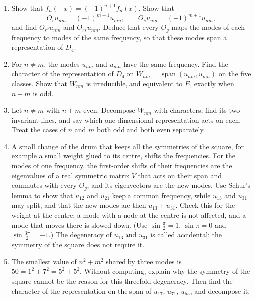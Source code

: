 \documentclass[11pt,a4paper]{article}
\makeatletter
\DeclareMathOperator{\spn}{span}
\newcommand{\showsolution}[1]{%
  \ifdefined\withsolutions\@ifundefined{sol@#1}{}{%
    \par\vspace{0.6em}\noindent\textbf{Solution.}\par\vspace{0.1em}{\sloppy\@nameuse{sol@#1}\par}\vspace{0.4em}\hrule}\fi}
\makeatother
\begin{document}
\begin{enumerate}
  \item Show that $f_n(-x) = (-1)^{n+1}f_n(x)$. Show that
  \[
    O_r u_{nm} = (-1)^{m+1}u_{mn}, \qquad O_s u_{nm} = (-1)^{m+1}u_{nm},
  \]
  and find $O_{r^2}u_{nm}$ and $O_{rs}u_{nm}$. Deduce that every $O_g$ maps the modes of each frequency to modes of the same frequency, so that these modes span a representation of $D_4$.
  \item For $n \ne m$, the modes $u_{nm}$ and $u_{mn}$ have the same frequency. Find the character of the representation of $D_4$ on $W_{nm} = \spn(u_{nm}, u_{mn})$ on the five classes. Show that $W_{nm}$ is irreducible, and equivalent to $E$, exactly when $n + m$ is odd.
  \item Let $n \ne m$ with $n + m$ even. Decompose $W_{nm}$ with characters, find its two invariant lines, and say which one-dimensional representation acts on each. Treat the cases of $n$ and $m$ both odd and both even separately.
  \item A small change of the drum that keeps all the symmetries of the square, for example a small weight glued to its centre, shifts the frequencies. For the modes of one frequency, the first-order shifts of their frequencies are the eigenvalues of a real symmetric matrix $V$ that acts on their span and commutes with every $O_g$, and its eigenvectors are the new modes. Use Schur's lemma to show that $u_{12}$ and $u_{21}$ keep a common frequency, while $u_{13}$ and $u_{31}$ may split, and that the new modes are then $u_{13} \pm u_{31}$. Check this for the weight at the centre: a mode with a node at the centre is not affected, and a mode that moves there is slowed down. (Use $\sin\frac{\pi}{2} = 1$, $\sin\pi = 0$ and $\sin\frac{3\pi}{2} = -1$.) The degeneracy of $u_{13}$ and $u_{31}$ is called accidental: the symmetry of the square does not require it.
  \item The smallest value of $n^2 + m^2$ shared by three modes is $50 = 1^2 + 7^2 = 5^2 + 5^2$. Without computing, explain why the symmetry of the square cannot be the reason for this threefold degeneracy. Then find the character of the representation on the span of $u_{17}$, $u_{71}$, $u_{55}$, and decompose it.
\end{enumerate}
\showsolution{25}
\end{document}
